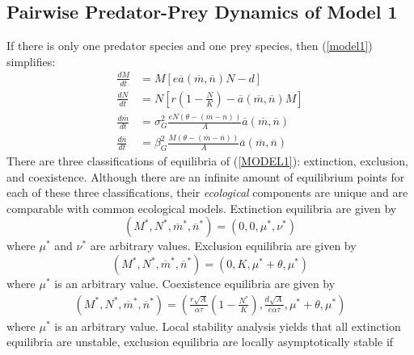 \documentclass{amsart}
\theoremstyle{definition}
\theoremstyle{remark}
\numberwithin{equation}{section}
\begin{document}
\subsection{Pairwise Predator-Prey Dynamics of Model 1}
If there is only one predator species and one prey species, then (\ref{model1}) simplifies:
\begin{subequations}
	\label{MODEL1}
	\begin{align}
		\label{eq:MODEL1_A}
		\frac{dM}{dt} &= M\left[e\overline{a}(\overline{m}, \overline{n})N - d\right] \\[5px]
		\label{eq:MODEL1_B}
		\frac{dN}{dt} &= N\left[r\left(1 - \frac{N}{K}\right) - \overline{a}(\overline{m}, \overline{n})M\right] \\[5px]
		\label{eq:MODEL1_C}
		\frac{d\overline{m}}{dt} &= \sigma_{G}^2\frac{eN(\theta - (\overline{m} - \overline{n}))}{A}\overline{a}(\overline{m}, \overline{n}) \\[5px]
		\label{eq:MODEL1_D}
		\frac{d\overline{n}}{dt} &= \beta_{G}^2\frac{M(\theta - (\overline{m} - \overline{n}))}{A}\overline{a}(\overline{m}, \overline{n})
	\end{align}
\end{subequations}
There are three classifications of equilibria of (\ref{MODEL1}): extinction, exclusion, and coexistence.  Although there are an infinite amount of equilibrium points for each of these three classifications, their {\it ecological} components are unique and are comparable with common ecological models.  Extinction equilibria are given by
\begin{equation}
	\label{extinction_MODEL1}
	(M^*, N^*, \overline{m}^*, \overline{n}^*) = (0, 0, \mu^*, \nu^*)
\end{equation}
where $\mu^*$ and $\nu^*$ are arbitrary values.  Exclusion equilibria are given by
\begin{equation}
	\label{exclusion_MODEL1}
	(M^*, N^*, \overline{m}^*, \overline{n}^*) = (0, K, \mu^* + \theta, \mu^*)
\end{equation}
where $\mu^*$ is an arbitrary value.  Coexistence equilibria are given by
\begin{equation}
	\label{coexistence_MODEL1}
	\begin{aligned}
		(M^*, N^*, \overline{m}^*, \overline{n}^*) = \left(\frac{r\sqrt{A}}{\alpha\tau}\left(1 - \frac{N^*}{K}\right), \frac{d\sqrt{A}}{e\alpha\tau}, \mu^* + \theta, \mu^*\right)
	\end{aligned}
\end{equation}
where $\mu^*$ is an arbitrary value.  Local stability analysis yields that all extinction equilibria are unstable, exclusion equilibria are locally asymptotically stable if
\end{document}
